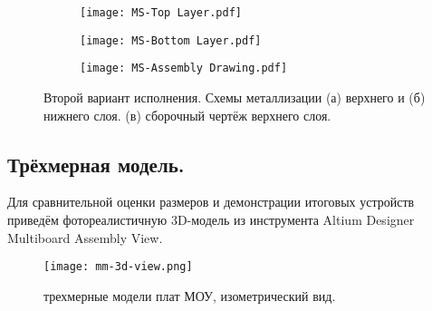 \begin{figure}[H]
	\centering
	\begin{subfigure}[c]{0.325\textwidth}
		\centering
		\texttt{[image: MS-Top Layer.pdf]}
		\caption{}%
		\label{fig:MS-TopLayer}
	\end{subfigure}
	\hfil
	\begin{subfigure}[c]{0.325\textwidth}
		\centering
		\texttt{[image: MS-Bottom Layer.pdf]}
		\caption{}%
		\label{fig:MS-BottomLayer}
	\end{subfigure}
	\hfil
	\begin{subfigure}[c]{0.325\textwidth}
		\centering
		\texttt{[image: MS-Assembly Drawing.pdf]}
		\caption{}%
		\label{fig:MS-AssemblyDrawing}
	\end{subfigure}
	\caption{Второй вариант исполнения. Схемы металлизации (а) верхнего и (б) нижнего слоя. (в) сборочный чертёж верхнего слоя.}
	\label{fig:ms-layers}
\end{figure}


\subsection{Трёхмерная модель.}

Для сравнительной оценки размеров и демонстрации итоговых устройств приведём фотореалистичную 3D-модель из инструмента Altium Designer \linebreak Multiboard Assembly View.

\begin{figure}[H]
	\centering
	\texttt{[image: mm-3d-view.png]}
	\caption{трехмерные модели плат МОУ, изометрический вид.}
	\label{fig:mm-3d-view}
\end{figure}

